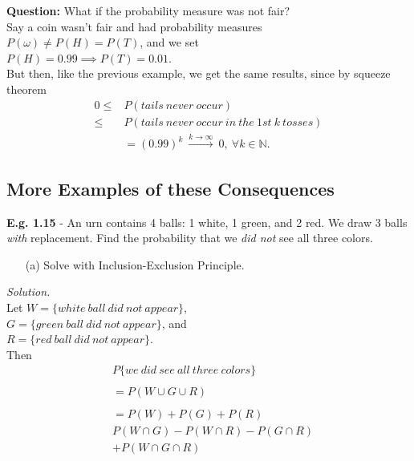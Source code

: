 \documentclass[12pt]{book}
\begin{document}
\newpage
\noindent \textbf{Question:} What if the probability measure was not fair?\\
Say a coin wasn't fair and had probability measures\\
$P(\omega) \neq P(H)=P(T)$, and we set\\
$P(H)=0.99 \implies P(T) = 0.01$.\\
But then, like the previous example, we get the same results, since by squeeze theorem
$$\begin{aligned}
0\leq &P(tails~never~occur) \\\leq 
&P(tails~never~occur~in~the~1st~k~tosses)\\
&=\left(0.99\right)^{k} ~\xrightarrow{k\to \infty}~ 0 
,~\forall k\in \mathbb{N}.
\end{aligned}$$



\subsection{More Examples of these Consequences}
\noindent \textbf{E.g. 1.15} - An urn contains 4 balls: 1 white, 1 green, and 2 red. We draw 3 balls \textit{with} replacement. Find the probability that we \textit{did not} see all three colors.
\begin{itemize}\item[(a)] Solve with Inclusion-Exclusion Principle.\end{itemize}
\textit{Solution.}\\
Let $W = \{white~ball~did~not~appear\}$, \\
$G = \{green~ball~did~not~appear\}$, and \\
$R = \{red~ball~did~not~appear\}$.\\
Then 
\begin{align*}
&P\{we~did~see~all~three~colors\} \\\\
&= P(W \cup G \cup R) \\\\
&=P(W) + P(G) + P(R)\\
&P(W \cap G) -P(W \cap R) -P(G \cap R)\\
&+P(W\cap G\cap R)\\\\
\end{align*}
\end{document}
